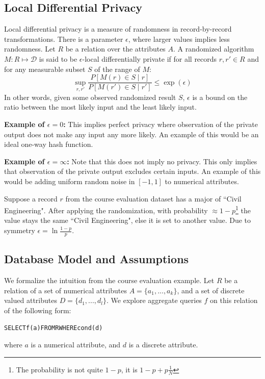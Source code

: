 \subsection{Local Differential Privacy}
Local differential privacy is a measure of randomness in record-by-record transformations.
There is a parameter $\epsilon$, where larger values implies less randomness.
Let $R$ be a relation over the attributes $A$. A randomized algorithm
$M:R\mapsto\mathcal{D}$ is said to be $\epsilon$-local differentially
private if for all records $r,r'\in R$ and for any measurable subset
$S$ of the range of $M$:
\[
\sup_{r,r'}\frac{P[M(r)\in S\mid r]}{P[M(r')\in S\mid r']}\le\exp(\epsilon)
\]
In other words, given some observed randomized result $S$, $\epsilon$ is a bound on the ratio between the most likely input and the least likely input.

\noindent\textbf{Example of $\epsilon=0$: } This implies perfect privacy where observation of the private output does not make any input any more likely. An example of this would be an ideal one-way hash function.

\vspace{0.5em}

\noindent\textbf{Example of $\epsilon=\infty$: } Note that this does not imply no privacy. This only implies that observation of the private output excludes certain inputs. An example of this would be adding uniform random noise in $[-1,1]$ to numerical attributes. 

\begin{example}
Suppose a record $r$ from the course evaluation dataset has a \textsf{major} of ``Civil Engineering".
After applying the randomization, with probability $\approx 1-p$\footnote{The probability is not quite $1-p$, it is $1-p+p\frac{1}{N}$} the value stays the same ``Civil Engineering", else it is set to another value.
Due to symmetry $\epsilon = \ln \frac{1-p}{p}$.
\end{example}

\subsection{Database Model and Assumptions}
We formalize the intuition from the course evaluation example.
Let $R$ be a relation of a set of numerical attributes $A = \{a_1,...,a_k\}$, and a set of discrete valued attributes $D = \{d_1,...,d_l\}$.
We explore aggregate queries $f$ on this relation of the following form:
\begin{alltt}
SELECT \textsf{f}(a) FROM R WHERE cond(d)
\end{alltt}
where $a$ is a numerical attribute, and $d$ is a discrete attribute.


